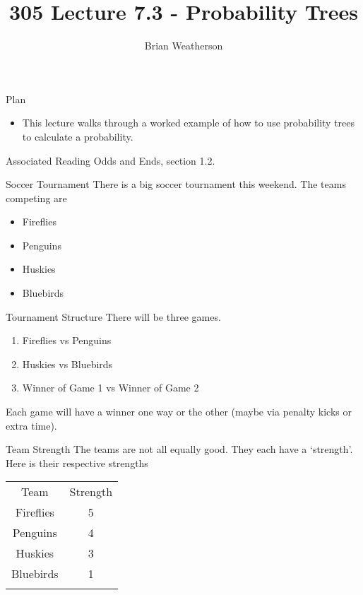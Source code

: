 \documentclass[
  ignorenonframetext,
]{beamer}
\title{305 Lecture 7.3 - Probability Trees}
\author{Brian Weatherson}
\date{}
\providecommand{\tightlist}{%
  \setlength{\itemsep}{0pt}\setlength{\parskip}{0pt}}
\renewcommand{\,}{\text{, }}
\begin{document}
\frame{\titlepage}

\begin{frame}{Plan}
\protect\hypertarget{plan}{}
\begin{itemize}
\tightlist
\item
  This lecture walks through a worked example of how to use probability
  trees to calculate a probability.
\end{itemize}
\end{frame}

\begin{frame}{Associated Reading}
\protect\hypertarget{associated-reading}{}
Odds and Ends, section 1.2.
\end{frame}

\begin{frame}{Soccer Tournament}
\protect\hypertarget{soccer-tournament}{}
There is a big soccer tournament this weekend. The teams competing are

\begin{itemize}
\tightlist
\item
  Fireflies
\item
  Penguins
\item
  Huskies
\item
  Bluebirds
\end{itemize}
\end{frame}

\begin{frame}{Tournament Structure}
\protect\hypertarget{tournament-structure}{}
There will be three games.

\begin{enumerate}
\tightlist
\item
  Fireflies vs Penguins
\item
  Huskies vs Bluebirds
\item
  Winner of Game 1 vs Winner of Game 2
\end{enumerate}

Each game will have a winner one way or the other (maybe via penalty
kicks or extra time).
\end{frame}

\begin{frame}{Team Strength}
\protect\hypertarget{team-strength}{}
The teams are not all equally good. They each have a `strength'. Here is
their respective strengths

\begin{longtable}[]{@{}cc@{}}
\toprule
Team & Strength \\ \addlinespace
\midrule
\endhead
Fireflies & 5 \\ \addlinespace
Penguins & 4 \\ \addlinespace
Huskies & 3 \\ \addlinespace
Bluebirds & 1 \\ \addlinespace
\bottomrule
\end{longtable}
\end{frame}
\end{document}
